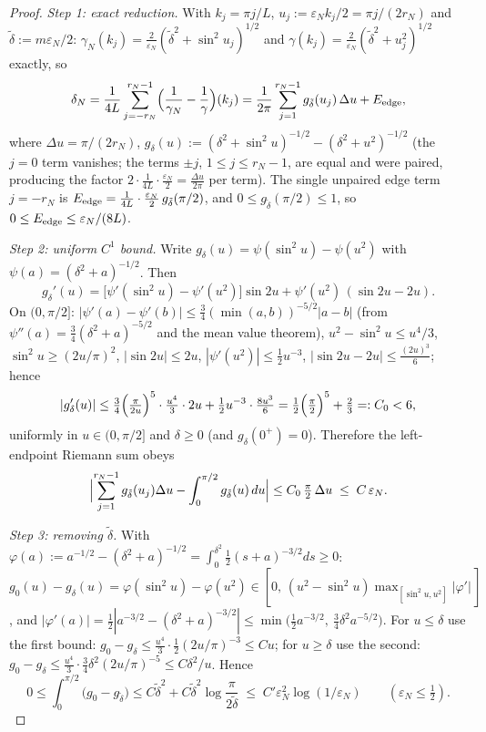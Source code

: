 \documentclass[11pt,a4paper]{article}
\theoremstyle{plain}
\theoremstyle{definition}
\newcommand{\eps}{\varepsilon}
\begin{document}
\begin{proof}
\emph{Step 1: exact reduction.} With $k_j=\pi j/L$, $u_j:=\eps_Nk_j/2
=\pi j/(2r_N)$ and $\tilde\delta:=m\eps_N/2$:
$\gamma_N(k_j)=\tfrac2{\eps_N}(\tilde\delta^2+\sin^2u_j)^{1/2}$ and
$\gamma(k_j)=\tfrac2{\eps_N}(\tilde\delta^2+u_j^2)^{1/2}$ exactly, so
\[
 \delta_N=\frac1{4L}\sum_{j=-r_N}^{r_N-1}
 \Bigl(\frac1{\gamma_N}-\frac1\gamma\Bigr)(k_j)
 =\frac1{2\pi}\sum_{j=1}^{r_N-1}g_{\tilde\delta}(u_j)\,\Delta u
 +E_{\rm edge},
\]
where $\Delta u=\pi/(2r_N)$,
$g_\delta(u):=(\delta^2+\sin^2u)^{-1/2}-(\delta^2+u^2)^{-1/2}$
(the $j=0$ term vanishes; the terms $\pm j$, $1\le j\le r_N-1$, are equal and
were paired, producing the factor $2\cdot\frac1{4L}\cdot\frac{\eps_N}2
=\frac{\Delta u}{2\pi}$ per term). The single unpaired edge term $j=-r_N$ is
$E_{\rm edge}=\frac1{4L}\cdot\frac{\eps_N}2\,g_{\tilde\delta}(\pi/2)$, and
$0\le g_{\tilde\delta}(\pi/2)\le1$, so $0\le E_{\rm edge}\le\eps_N/(8L)$.

\emph{Step 2: uniform $C^1$ bound.} Write $g_\delta(u)
=\psi(\sin^2u)-\psi(u^2)$ with $\psi(a)=(\delta^2+a)^{-1/2}$. Then
\[
 g_\delta'(u)=\bigl[\psi'(\sin^2u)-\psi'(u^2)\bigr]\sin2u
 +\psi'(u^2)\,(\sin2u-2u).
\]
On $(0,\pi/2]$: $|\psi'(a)-\psi'(b)|\le\tfrac34(\min(a,b))^{-5/2}|a-b|$
(from $\psi''(a)=\tfrac34(\delta^2+a)^{-5/2}$ and the mean value theorem),
$u^2-\sin^2u\le u^4/3$, $\sin^2u\ge(2u/\pi)^2$, $|\sin2u|\le2u$,
$|\psi'(u^2)|\le\tfrac12u^{-3}$, $|\sin2u-2u|\le\tfrac{(2u)^3}6$; hence
\[
 |g_\delta'(u)|\le\tfrac34\Bigl(\tfrac\pi{2u}\Bigr)^5\cdot\tfrac{u^4}3
 \cdot2u+\tfrac12u^{-3}\cdot\tfrac{8u^3}6
 =\tfrac12\Bigl(\tfrac\pi2\Bigr)^5+\tfrac23=:C_0<6,
\]
uniformly in $u\in(0,\pi/2]$ and $\delta\ge0$ (and $g_\delta(0^+)=0$). Therefore the left-endpoint Riemann sum obeys
\[
 \Bigl|\sum_{j=1}^{r_N-1}g_{\tilde\delta}(u_j)\Delta u
 -\int_0^{\pi/2}g_{\tilde\delta}(u)\,du\Bigr|
 \le C_0\,\tfrac\pi2\,\Delta u\;\le\;C\,\eps_N .
\]

\emph{Step 3: removing $\tilde\delta$.} With
$\varphi(a):=a^{-1/2}-(\delta^2+a)^{-1/2}
=\int_0^{\delta^2}\tfrac12(s+a)^{-3/2}ds\ge0$:
$g_0(u)-g_\delta(u)=\varphi(\sin^2u)-\varphi(u^2)\in[0,\,
(u^2-\sin^2u)\max_{[\sin^2u,u^2]}|\varphi'|\,]$, and
$|\varphi'(a)|=\tfrac12|a^{-3/2}-(\delta^2+a)^{-3/2}|
\le\min\bigl(\tfrac12a^{-3/2},\ \tfrac34\delta^2a^{-5/2}\bigr)$. For
$u\le\delta$ use the first bound:
$g_0-g_\delta\le\tfrac{u^4}3\cdot\tfrac12(2u/\pi)^{-3}\le Cu$; for
$u\ge\delta$ use the second:
$g_0-g_\delta\le\tfrac{u^4}3\cdot\tfrac34\delta^2(2u/\pi)^{-5}
\le C\delta^2/u$. Hence
\[
 0\le\int_0^{\pi/2}\bigl(g_0-g_{\tilde\delta}\bigr)
 \le C\tilde\delta^2+C\tilde\delta^2\log\frac\pi{2\tilde\delta}
 \;\le\;C'\eps_N^2\log(1/\eps_N)\qquad(\eps_N\le\tfrac12).
\]


\end{proof}
\end{document}

